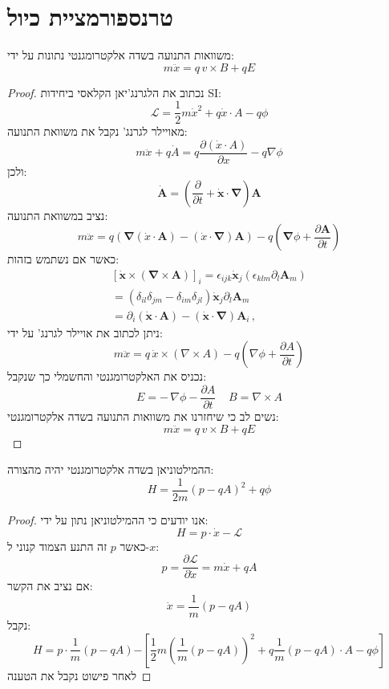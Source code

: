 \documentclass{tstextbook}
\begin{document}
\section{טרנספורמציית כיול}

\begin{proposition}
משוואות התנועה בשדה אלקטרומגנטי נתונות על ידי:
$$m{\ddot{x}}=q\,v\times B+q E$$

\end{proposition}
\begin{proof}
נכתוב את הלגרנג'יאן הקלאסי ביחידות SI:
$${\mathcal{L}}={\frac{1}{2}}m{\dot{x}}^{2}+q{\dot{x}}\cdot A-q\phi$$
מאויילר לגרנג' נקבל את משוואת התנועה:
$$m{\ddot{x}}+q{\dot{A}}=q{\frac{\partial({\dot{x}}\cdot A)}{\partial x}}-q\nabla\phi$$
ולכן:
$$\dot{\mathbf{A}}=\left({\frac{\partial}{\partial t}}+{\dot{\mathbf{x}}}\cdot\mathbf{\nabla}\right)\mathbf{A}$$
נציב במשוואת התנועה:
$$m{\ddot{x}}=q\left(\mathbf{\nabla}({\dot{x}}\cdot\mathbf{A})-({\dot{x}}\cdot\mathbf{\nabla})\mathbf{A}\right)-q\left(\mathbf{\nabla}\phi+{\frac{\partial\mathbf{A}}{\partial t}}\right)$$
כאשר אם נשתמש בזהות:
$$\begin{array}{c}{{\left[\dot{\mathbf{x}}\times\left(\mathbf{\nabla}\times\mathbf{A}\right)\right]_{i}=\epsilon_{i j k}\dot{\mathbf{x}}_{j}\left(\epsilon_{k l m}\partial_{l}\mathbf{A}_{m}\right)}}\\ {{=\left(\delta_{i l}\delta_{j m}-\delta_{i m}\delta_{j l}\right)\dot{\mathbf{x}}_{j}\partial_{l}\mathbf{A}_{m}}}\\ {{=\partial_{i}\left(\dot{\mathbf{x}}\cdot\mathbf{A}\right)-\left(\dot{\mathbf{x}}\cdot\mathbf{\nabla}\right)\mathbf{A}_{i}\,,}}\end{array}$$
ניתן לכתוב את אויילר לגרנג' על ידי:
$$m{\ddot{x}}=q\,{\dot{x}}\times(\nabla\times A)-q\left(\nabla\phi+{\frac{\partial A}{\partial t}}\right)$$
נכניס את האלקטרומגנטי והחשמלי כך שנקבל:
$$E=-\,\nabla\phi-\frac{\partial A}{\partial t}\;\;\;\;B=\nabla\times A$$
נשים לב כי שיחזרנו את משוואות התנועה בשדה אלקטרומגנטי:
$$m{\ddot{x}}=q\,v\times B+q E$$

\end{proof}
\begin{proposition}
ההמילטוניאן בשדה אלקטרומגנטי יהיה מהצורה:
$$H=\frac{1}{2m}\left(p-q A\right)^{2}+q\phi$$

\end{proposition}
\begin{proof}
אנו יודעים כי ההמילטוניאן נתון על ידי:
$$H=p\cdot\dot{x}-{\mathcal{L}}$$
כאשר \(p\) זה התנע הצמוד קנוני ל-\(x\):
$$p={\frac{\partial{\mathcal{L}}}{\partial{\dot{x}}}}=m{\dot{x}}+q A$$
אם נציב את הקשר:
$${\dot{x}}={\frac{1}{m}}\left(p-q A\right)$$
נקבל:
$${{H=p\cdot\frac{1}{m}\left(p-q A\right)}} {{-\left[\frac{1}{2}m\left(\frac{1}{m}\left(p-q A\right)\right)^{2}+q\frac{1}{m}\left(p-q A\right)\cdot A-q\phi\right]}}$$
לאחר פישוט נקבל את הטענה

\end{proof}
\end{document}

